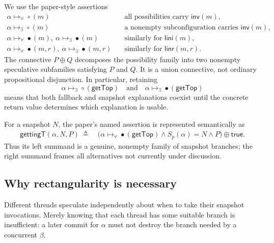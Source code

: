\documentclass[11pt]{article}
\theoremstyle{definition}
\theoremstyle{remark}
\newcommand{\Inv}{\mathsf{inv}}
\newcommand{\Lini}{\mathsf{lini}}
\newcommand{\Linr}{\mathsf{linr}}
\newcommand{\GetTop}{\mathsf{getTop}}
\newcommand{\oplusset}{\mathbin{\oplus}}
\newcommand{\alltok}[2]{#1\mathrel{\mapsto_{\forall}}#2}
\newcommand{\sometok}[2]{#1\mathrel{\mapsto_{\exists}}#2}
\begin{document}
We use the paper-style assertions
\begin{align*}
  \alltok{\alpha}{\circ(m)}
    &\quad\text{all possibilities carry }\Inv(m),\\
  \sometok{\alpha}{\circ(m)}
    &\quad\text{a nonempty subconfiguration carries }\Inv(m),\\
  \alltok{\alpha}{\bullet(m)},\ \sometok{\alpha}{\bullet(m)}
    &\quad\text{similarly for }\Lini(m),\\
  \alltok{\alpha}{\bullet(m,r)},\ \sometok{\alpha}{\bullet(m,r)}
    &\quad\text{similarly for }\Linr(m,r).
\end{align*}
The connective \(P\oplusset Q\) decomposes the possibility family into two
nonempty speculative subfamilies satisfying \(P\) and \(Q\).  It is a union
connective, not ordinary propositional disjunction.  In particular, retaining
\[
  \sometok{\alpha}{\circ(\GetTop)}
  \quad\text{and}\quad
  \sometok{\alpha}{\bullet(\GetTop)}
\]
means that both fallback and snapshot explanations coexist until the concrete
return value determines which explanation is usable.

For a snapshot \(N\), the paper's named assertion is represented semantically
as
\[
\begin{split}
  \mathsf{gettingT}(\alpha,N,P)\ \triangleq\ &
  \bigl(\alltok{\alpha}{\bullet(\GetTop)}
   \land S_p(\alpha)=N\land P\bigr)
   \oplusset \mathsf{true}.
\end{split}
\]
Thus its left summand is a genuine, nonempty family of snapshot branches; the
right summand frames all alternatives not currently under discussion.

\subsection{Why rectangularity is necessary}

Different threads speculate independently about when to take their snapshot
invocations.  Merely knowing that each thread has some suitable branch is
insufficient: a later commit for \(\alpha\) must not destroy the branch needed
by a concurrent \(\beta\).
\end{document}
